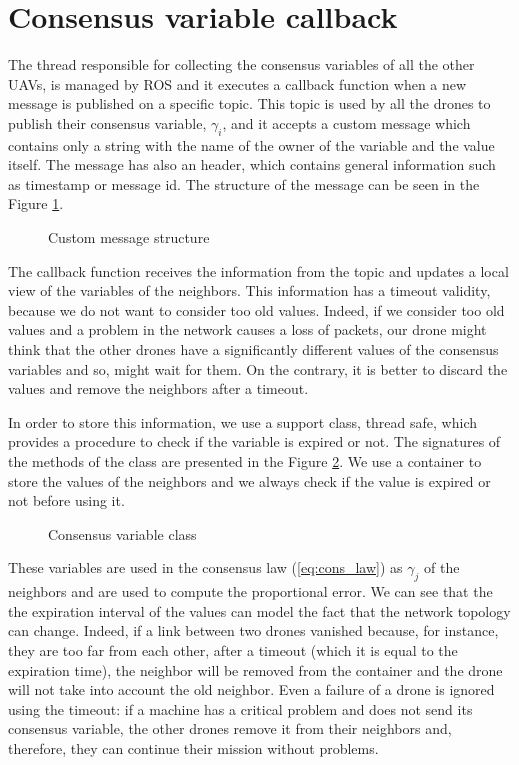 \section{Consensus variable callback\label{sec:consensus_variable_callback}}

The thread responsible for collecting the consensus variables of all the other UAVs,
is managed by ROS and it executes a callback function when a new message is published
on a specific topic.
This topic is used by all the drones to publish their consensus variable, $\gamma_i$,
and it accepts a custom message which contains only a string with the name of the
owner of the variable and the value itself. The message has also an header, which contains
general information such as timestamp or message id.
The structure of the message can be seen in the Figure \ref{fig:custom_message}.

\begin{figure}
\centering
  
\caption{Custom message structure}
\label{fig:custom_message}
\end{figure}

The callback function receives the information from the topic and updates a local
view of the variables of the neighbors. This information has a timeout validity,
because we do not want to consider too old values. Indeed, if we consider too old
values and a problem in the network causes a loss of packets, our drone might
think that the other drones have a significantly different values of the consensus variables
and so, might wait for them. On the contrary, it is better to discard the values and
remove the neighbors after a timeout.

In order to store this information, we use a support class, thread safe, which
provides a procedure to check if the variable is expired or not.
The signatures of the methods of the class are presented in the Figure
\ref{fig:consensuss_variable_class}.
We use a container to store the values of the neighbors and we always check if the
value is expired or not before using it.

\begin{figure}
\centering
  
\caption{Consensus variable class}
\label{fig:consensuss_variable_class}
\end{figure}

These variables are used in the consensus law (\ref{eq:cons_law})
as $\gamma_j$ of the neighbors and are used to compute the proportional error.
We can see that the the expiration interval of the values can model the
fact that the network topology can change.
Indeed, if a link between two drones vanished because, for instance, they are
too far from each other, after a timeout (which it is equal to the expiration time),
the neighbor will be removed from the container and the drone will not take into
account the old neighbor.
Even a failure of a drone is ignored using the timeout: if a machine has a critical
problem and does not send its consensus variable, the other drones remove it from
their neighbors and, therefore, they can continue their mission without problems.
